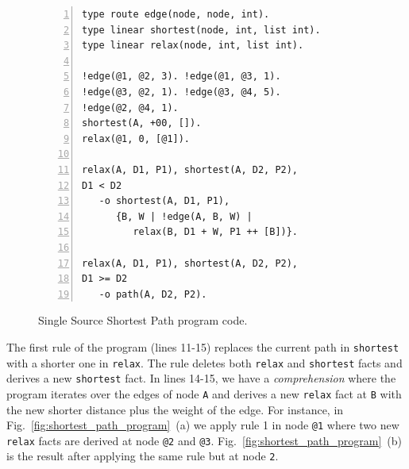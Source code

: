 \begin{figure}[h!]
\scriptsize\begin{Verbatim}[numbers=left]
type route edge(node, node, int).
type linear shortest(node, int, list int).
type linear relax(node, int, list int).

!edge(@1, @2, 3). !edge(@1, @3, 1).
!edge(@3, @2, 1). !edge(@3, @4, 5).
!edge(@2, @4, 1).
shortest(A, +00, []).
relax(@1, 0, [@1]).

relax(A, D1, P1), shortest(A, D2, P2),
D1 < D2
   -o shortest(A, D1, P1),
      {B, W | !edge(A, B, W) |
         relax(B, D1 + W, P1 ++ [B])}.

relax(A, D1, P1), shortest(A, D2, P2),
D1 >= D2
   -o path(A, D2, P2).
\end{Verbatim}
  \caption{Single Source Shortest Path program code.}
  \label{code:shortest_path_program}
\end{figure}
\normalsize

The first rule of the program (lines 11-15) replaces the current path in
\texttt{shortest} with a shorter one in \texttt{relax}. The rule deletes both
\texttt{relax} and \texttt{shortest} facts and derives a new \texttt{shortest}
fact. In lines 14-15, we have a \emph{comprehension} where the program iterates
over the edges of node \texttt{A} and derives a new \texttt{relax} fact at
\texttt{B} with the new shorter distance plus the weight of the edge. For
instance, in Fig.~\ref{fig:shortest_path_program}~(a) we apply rule 1 in node
\texttt{@1} where two new \texttt{relax} facts are derived at node \texttt{@2}
and \texttt{@3}. Fig.~\ref{fig:shortest_path_program}~(b) is the result after
applying the same rule but at node \texttt{2}.

